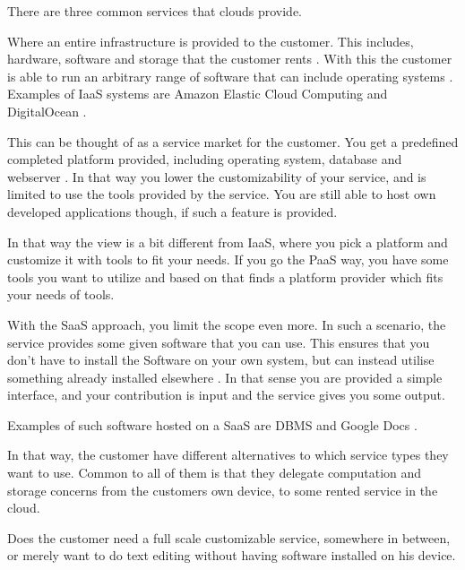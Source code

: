 There are three common services that clouds provide.
\begin{description}[style=nextline]
\item[Infrastructure as a Service (IaaS)]
Where an entire infrastructure is provided to the customer.
This includes, hardware, software and storage that the customer rents \citep{article:mobilecloudreviewinderkilde}.
With this the customer is able to run an arbitrary range of software that can include operating systems \citep{misc:indersuverymcc}.
Examples of IaaS systems are Amazon Elastic Cloud Computing \citep{misc:amazonelastic} and DigitalOcean \citep{misc:digitalocean}.
\item[Platform as a Service (PaaS)]
This can be thought of as a service market for the customer.
You get a predefined completed platform provided, including operating system, database and webserver \cite{article:mobilecloudreviewinderkilde}.
In that way you lower the customizability of your service, and is limited to use the tools provided by the service.
You are still able to host own developed applications though, if such a feature is provided.

In that way the view is a bit different from IaaS, where you pick a platform and customize it with tools to fit your needs.
If you go the PaaS way, you have some tools you want to utilize and based on that finds a platform provider which fits your needs of tools.

\item[Software as a Service (SaaS)]
With the SaaS approach, you limit the scope even more.
In such a scenario, the service provides some given software that you can use.
This ensures that you don't have to install the Software on your own system, but can instead utilise something already installed elsewhere \citep{article:mobilecloudreviewinderkilde,misc:indersuverymcc}.
In that sense you are provided a simple interface, and your contribution is input and the service gives you some output.

Examples of such software hosted on a SaaS are DBMS and Google Docs \citep{article:mobilecloudreviewinderkildesecurity}. 
\end{description}
In that way, the customer have different alternatives to which service types they want to use.
Common to all of them is that they delegate computation and storage concerns from the customers own device, to some rented service in the cloud.

Does the customer need a full scale customizable service, somewhere in between, or merely want to do text editing without having software installed on his device.